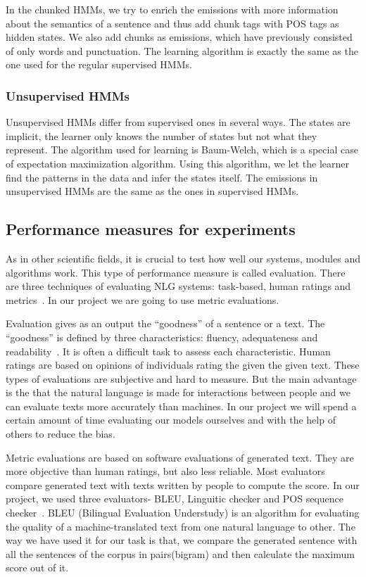 \documentclass[a4paper,12pt]{article}
\begin{document}
In the chunked HMMs, we try to enrich the emissions with more
information about the semantics of a sentence and thus add chunk tags with POS
tags as hidden states. We also add chunks as emissions, which have previously
consisted of only words and punctuation. The learning algorithm is exactly the
same as the one used for the regular supervised HMMs.

\subsubsection{Unsupervised HMMs}
Unsupervised HMMs differ from supervised ones in several ways. The states are
implicit, the learner only knows the number of states but not what they
represent. The algorithm used for learning is Baum-Welch, which is a special
case of expectation maximization algorithm. Using this algorithm, we let the
learner find the patterns in the data and infer the states itself. The emissions
in unsupervised HMMs are the same as the ones in supervised HMMs.


\subsection {Performance measures for experiments}

As in other scientific fields, it is crucial to test how well our systems,
modules and algorithms work. This type of performance measure is called
evaluation. There are three techniques of evaluating NLG systems: task-based,
human ratings and metrics~\cite{evalnlg}. In our project we are going to use
metric evaluations.

Evaluation gives as an output the ``goodness'' of a sentence or a text. The
``goodness'' is defined by three characteristics: fluency, adequateness and
readability~\cite{evalmethods}. It is often a difficult task to assess each
characteristic.
Human ratings are based on opinions of individuals rating the given the given
text. These types of evaluations are subjective and hard to measure. But the
main advantage is the that the natural language is made for interactions between
people and we can evaluate texts more accurately than machines. In our project
we will spend a certain amount of time evaluating our models ourselves and with
the help of others to reduce the bias.

Metric evaluations are based on software evaluations of generated text. They are
more objective than human ratings, but also less reliable. Most evaluators
compare generated text with texts written by people to compute the score. In our
project, we used three evaluators- BLEU, Linguitic checker and POS sequence checker~\cite{autoeval}.
BLEU (Bilingual Evaluation Understudy) is an algorithm for evaluating the quality of a 
machine-translated text from one natural language to other. The way we have used it 
for our task is that, we compare the generated sentence with all the sentences of the
corpus in pairs(bigram) and then calculate the maximum score out of it.
\end{document}
